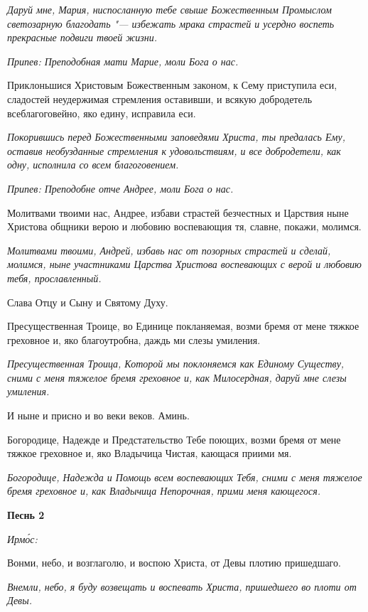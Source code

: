 \itshape Даруй мне, Мария, ниспосланную тебе свыше Божественным Промыслом светозарную благодать "--- избежать мрака страстей и усердно воспеть прекрасные подвиги твоей жизни.\normalfont{}


\itshape Припев:\normalfont{} Преподобная мати Марие, моли Бога о нас.


Приклоньшися Христовым Божественным законом, к Сему приступила еси, сладостей неудержимая стремления оставивши, и всякую добродетель всеблагоговейно, яко едину, исправила еси.


\itshape Покорившись перед Божественными заповедями Христа, ты предалась Ему, оставив необузданные стремления к удовольствиям, и все добродетели, как одну, исполнила со всем благоговением.\normalfont{}


\itshape Припев:\normalfont{} Преподобне отче Андрее, моли Бога о нас.


Молитвами твоими нас, Андрее, избави страстей безчестных и Царствия ныне Христова общники верою и любовию воспевающия тя, славне, покажи, молимся.


\itshape Молитвами твоими, Андрей, избавь нас от позорных страстей и сделай, молимся, ныне участниками Царства Христова воспевающих с верой и любовию тебя, прославленный.\normalfont{}


Слава Отцу и Сыну и Святому Духу.


Пресущественная Троице, во Единице покланяемая, возми бремя от мене тяжкое греховное и, яко благоутробна, даждь ми слезы умиления.


\itshape Пресущественная Троица, Которой мы поклоняемся как Единому Существу, сними с меня тяжелое бремя греховное и, как Милосердная, даруй мне слезы умиления.\normalfont{}


И ныне и присно и во веки веков. Аминь.


Богородице, Надежде и Предстательство Тебе поющих, возми бремя от мене тяжкое греховное и, яко Владычица Чистая, кающася приими мя.


\itshape Богородице, Надежда и Помощь всем воспевающих Тебя, сними с меня тяжелое бремя греховное и, как Владычица Непорочная, прими меня кающегося.\normalfont{}





\bfseries Песнь 2\normalfont{}


\itshape Ирмо́с:\normalfont{}


Вонми, небо, и возглаголю, и воспою Христа, от Девы плотию пришедшаго.


\itshape Внемли, небо, я буду возвещать и воспевать Христа, пришедшего во плоти от Девы.\normalfont{}



